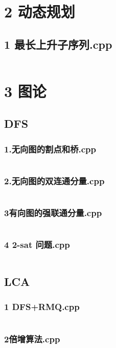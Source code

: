 \documentclass{article}
\begin{document}
\section{2 动态规划}
\subsection{1 最长上升子序列.cpp}
\inputminted{c++}{/home/zzuzxy/t2/Template1.0/2 动态规划/1 最长上升子序列.cpp}
\section{3 图论}
\subsection{DFS}
\subsubsection{1.无向图的割点和桥.cpp}
\inputminted{c++}{/home/zzuzxy/t2/Template1.0/3 图论/DFS/1.无向图的割点和桥.cpp}
\subsubsection{2.无向图的双连通分量.cpp}
\inputminted{c++}{/home/zzuzxy/t2/Template1.0/3 图论/DFS/2.无向图的双连通分量.cpp}
\subsubsection{3有向图的强联通分量.cpp}
\inputminted{c++}{/home/zzuzxy/t2/Template1.0/3 图论/DFS/3有向图的强联通分量.cpp}
\subsubsection{4 2-sat 问题.cpp}
\inputminted{c++}{/home/zzuzxy/t2/Template1.0/3 图论/DFS/4 2-sat 问题.cpp}
\subsection{LCA}
\subsubsection{1 DFS+RMQ.cpp}
\inputminted{c++}{/home/zzuzxy/t2/Template1.0/3 图论/LCA/1 DFS+RMQ.cpp}
\subsubsection{2倍增算法.cpp}
\inputminted{c++}{/home/zzuzxy/t2/Template1.0/3 图论/LCA/2倍增算法.cpp}
\end{document}
